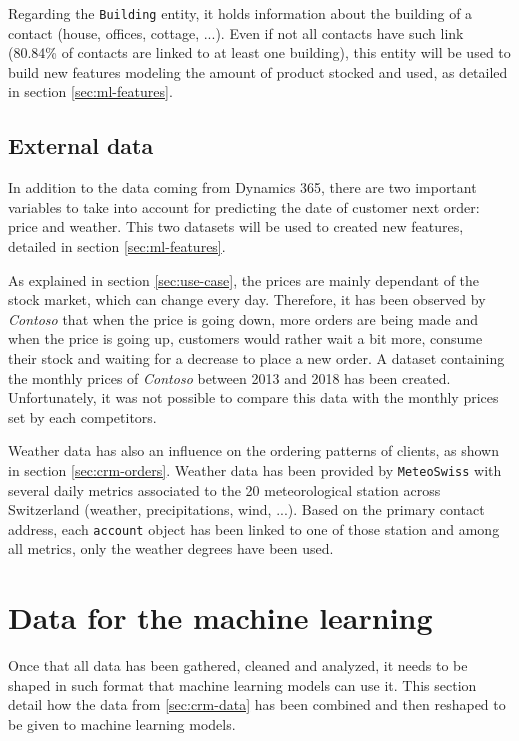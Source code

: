 Regarding the \texttt{Building} entity, it holds information about the building of a contact (house, offices, cottage, ...). Even if not all contacts have such link (80.84\% of contacts are linked to at least one building), this entity will be used to build new features modeling the amount of product stocked and used, as detailed in section \ref{sec:ml-features}.


\subsection{External data}\label{sec:external-data}
In addition to the data coming from Dynamics 365, there are two important variables to take into account for predicting the date of customer next order: price and weather. This two datasets will be used to created new features, detailed in section \ref{sec:ml-features}.

As explained in section \ref{sec:use-case}, the prices are mainly dependant of the stock market, which can change every day. Therefore, it has been observed by \textit{Contoso} that when the price is going down, more orders are being made and when the price is going up, customers would rather wait a bit more, consume their stock and waiting for a decrease to place a new order. A dataset containing the monthly prices of \textit{Contoso} between 2013 and 2018 has been created. Unfortunately, it was not possible to compare this data with the monthly prices set by each competitors.

Weather data has also an influence on the ordering patterns of clients, as shown in section \ref{sec:crm-orders}. Weather data has been provided by \texttt{MeteoSwiss} with several daily metrics associated to the 20 meteorological station across Switzerland (weather, precipitations, wind, ...). Based on the primary contact address, each \texttt{account} object has been linked to one of those station and among all metrics, only the weather degrees \big[°C\big] have been used.


\section{Data for the machine learning}
Once that all data has been gathered, cleaned and analyzed, it needs to be shaped in such format that machine learning models can use it. This section detail how the data from \ref{sec:crm-data} has been combined and then reshaped to be given to machine learning models.

